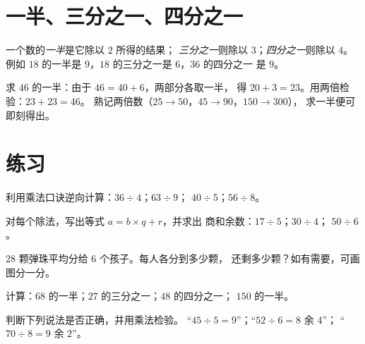 \section{一半、三分之一、四分之一}

\begin{definition}\label{def:g3:division:half}
一个数的\emph{一半}是它除以 $2$ 所得的结果；
\emph{三分之一}则除以 $3$；\emph{四分之一}则除以 $4$。例如
$18$ 的一半是 $9$，$18$ 的三分之一是 $6$，$36$ 的四分之一
是 $9$。
\end{definition}

\begin{example}[倍与一半相伴]\label{ex:g3:division:double}
求 $46$ 的一半：由于 $46 = 40 + 6$，两部分各取一半，
得 $20 + 3 = 23$。用两倍检验：$23 + 23 = 46$。
熟记两倍数（$25 \to 50$，$45 \to 90$，$150 \to 300$），
求一半便可即刻得出。
\end{example}

\section{练习}

\begin{exercise}[$\star$]\label{exo:g3:division:1}
利用乘法口诀逆向计算：$36 \div 4$；\quad $63 \div 9$；
\quad $40 \div 5$；\quad $56 \div 8$。
\end{exercise}

\begin{exercise}[$\star$]\label{exo:g3:division:2}
对每个除法，写出等式 $a = b \times q + r$，并求出
商和余数：$17 \div 5$；\quad $30 \div 4$；\quad
$50 \div 6$。
\end{exercise}

\begin{exercise}[$\star$]\label{exo:g3:division:3}
$28$ 颗弹珠平均分给 $6$ 个孩子。每人各分到多少颗，
还剩多少颗？如有需要，可画图分一分。
\end{exercise}

\begin{exercise}[$\star$]\label{exo:g3:division:4}
计算：$68$ 的一半；$27$ 的三分之一；$48$ 的四分之一；
$150$ 的一半。
\end{exercise}

\begin{exercise}[$\star$]\label{exo:g3:division:5}
判断下列说法是否正确，并用乘法检验。
“$45 \div 5 = 9$”；\quad “$52 \div 6 = 8$ 余 $4$”；
\quad “$70 \div 8 = 9$ 余 $2$”。
\end{exercise}

